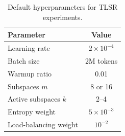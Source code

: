\documentclass{article}
\theoremstyle{plain}
\theoremstyle{definition}
\theoremstyle{remark}
\begin{document}
\begin{table}[h]
\centering
\begin{tabular}{lc}
\toprule
Parameter & Value \\
\midrule
Learning rate & $2\times 10^{-4}$ \\
Batch size & 2M tokens \\
Warmup ratio & 0.01 \\
Subspaces $m$ & 8 or 16 \\
Active subspaces $k$ & 2–4 \\
Entropy weight & $5\times 10^{-3}$ \\
Load-balancing weight & $10^{-2}$ \\
\bottomrule
\end{tabular}
\caption{Default hyperparameters for TLSR experiments.}
\end{table}



\end{document}
